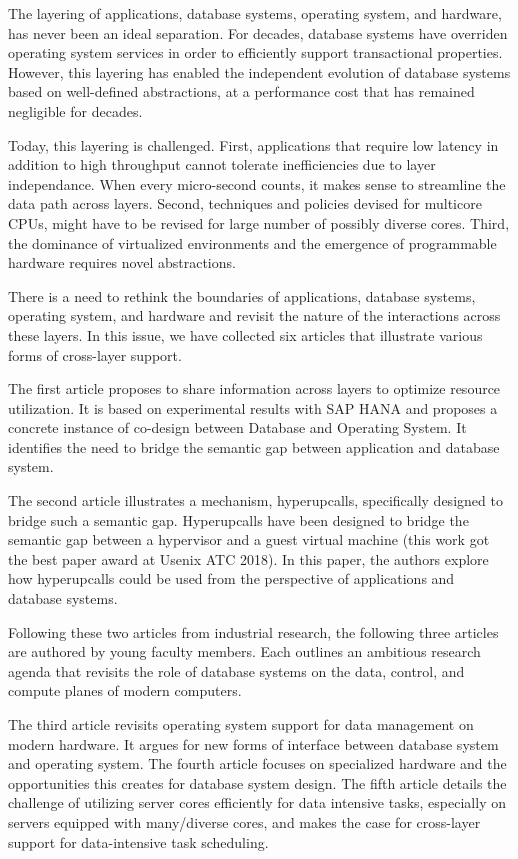 \documentclass[11pt]{article}
\begin{document}
The layering of applications, database systems, operating system, and hardware,
has never been an ideal separation. For decades, database systems have overriden 
operating system services in order to efficiently support transactional properties.
However, this layering has enabled the independent evolution of database systems based on 
well-defined abstractions, at a performance cost that has remained negligible for decades.

Today, this layering is
challenged. First, applications that require low latency in addition to high throughput
cannot tolerate inefficiencies due to layer independance. When every micro-second counts,
it makes sense to streamline the data path across layers.
Second, techniques and policies devised for multicore CPUs, might have to be revised for large number
of possibly diverse cores. Third, the dominance of virtualized environments and the emergence of 
programmable hardware requires novel abstractions.

There is a need to rethink the boundaries of applications, database systems, operating system,
and hardware and revisit the nature of the interactions across these layers. In this issue, we have collected 
six articles that illustrate various forms of cross-layer support. 

The first article proposes to share information across layers to optimize resource utilization. It is
based on experimental results with SAP HANA and proposes a concrete instance of co-design between Database 
and Operating System. It identifies the need to bridge the semantic gap between application and database system.

The second article illustrates a mechanism, hyperupcalls, specifically designed to bridge such a semantic gap.
Hyperupcalls have been designed to bridge the semantic gap between a hypervisor and a guest virtual machine 
(this work got the best paper award at Usenix ATC 2018). In this paper, the authors explore how hyperupcalls
could be used from the perspective of applications and database systems.

Following these two articles from industrial research, the following three articles are authored by young
faculty members. Each outlines an ambitious research agenda that 
revisits the role of database systems on the data, control, and compute planes of modern computers.

The third article revisits operating system support for data management on modern hardware. It argues for
new forms of interface between database system and operating system.
The fourth article focuses on specialized hardware and the opportunities this creates for database system design.
The fifth article details the challenge of utilizing server cores efficiently for data intensive tasks, especially
on servers equipped with many/diverse cores, and makes the case for cross-layer support for data-intensive
task scheduling.
\end{document}
